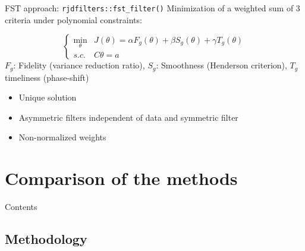 \documentclass[10pt,xcolor=table,color={dvipsnames,usenames},ignorenonframetext,usepdftitle=false,english]{beamer}
\newcommand\1{\mathds{1}}
\begin{document}
\begin{frame}{FST approach: 
\texttt{rjdfilters::fst\_filter()}}
\protect\hypertarget{fst-approach-rjdfiltersfst_filter}{}
Minimization of a weighted sum of 3 criteria under polynomial
constraints:

\[
\begin{cases}
\underset{\theta}{\min} & J(\theta)=
\alpha F_g(\theta)+\beta S_g(\theta)+\gamma T_g(\theta)\\
s.c. & C\theta=a
\end{cases}
\] \(F_g\): Fidelity (variance reduction ratio), \(S_g\): Smoothness
(Henderson criterion), \(T_g\) timeliness (phase-shift)

\pause

\begin{summary}

\begin{itemize}
\item
  \bcsmbh Unique solution
\item
  \bcsmbh Asymmetric filters independent of data and symmetric filter
\item
  \bcsmmh Non-normalized weights
\end{itemize}

\end{summary}
\end{frame}

\hypertarget{comparison-of-the-methods}{%
\section{Comparison of the methods}\label{comparison-of-the-methods}}

\begin{frame}{Contents}
\protect\hypertarget{contents-1}{}
\end{frame}

\hypertarget{methodology}{%
\subsection{Methodology}\label{methodology}}
\end{document}
